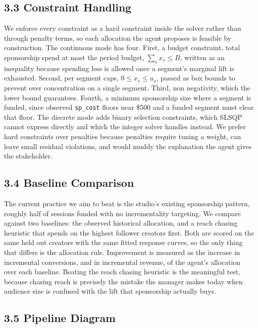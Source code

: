 \documentclass[11pt]{article}
\begin{document}
\subsection*{3.3 \; Constraint Handling}

We enforce every constraint as a hard constraint inside the solver rather than through penalty terms, so each allocation the agent proposes is feasible by construction. The continuous mode has four. First, a budget constraint, total sponsorship spend at most the period budget, $\sum_s x_s \le B$, written as an inequality because spending less is allowed once a segment's marginal lift is exhausted. Second, per segment caps, $0 \le x_s \le u_s$, passed as box bounds to prevent over concentration on a single segment. Third, non negativity, which the lower bound guarantees. Fourth, a minimum sponsorship size where a segment is funded, since observed \texttt{sp\_cost} floors near \$500 and a funded segment must clear that floor. The discrete mode adds binary selection constraints, which SLSQP cannot express directly and which the integer solver handles instead. We prefer hard constraints over penalties because penalties require tuning a weight, can leave small residual violations, and would muddy the explanation the agent gives the stakeholder.

\subsection*{3.4 \; Baseline Comparison}

The current practice we aim to beat is the studio's existing sponsorship pattern, roughly half of sessions funded with no incrementality targeting. We compare against two baselines: the observed historical allocation, and a reach chasing heuristic that spends on the highest follower creators first. Both are scored on the same held out creators with the same fitted response curves, so the only thing that differs is the allocation rule. Improvement is measured as the increase in incremental conversions, and in incremental revenue, of the agent's allocation over each baseline. Beating the reach chasing heuristic is the meaningful test, because chasing reach is precisely the mistake the manager makes today when audience size is confused with the lift that sponsorship actually buys.

\subsection*{3.5 \; Pipeline Diagram}
\end{document}

